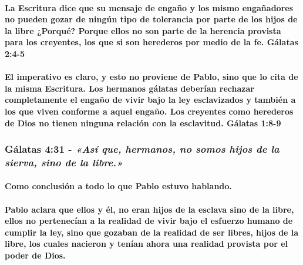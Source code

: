 \documentclass[11a pt,twoside]{article}
\newcommand{\scripture}[1]{%
  {\fontsize{12pt}{16pt}\selectfont\ScriptureFont\itshape #1}%
}
\let\oldsubsubsection\subsubsection
\renewcommand{\subsubsection}{\needspace{4\baselineskip}\oldsubsubsection}
\let\oldparagraph\paragraph
\renewcommand{\paragraph}{\needspace{3\baselineskip}\oldparagraph}
\begin{document}
\paragraph{La Escritura dice que su mensaje de engaño y los mismo
engañadores no pueden gozar de ningún tipo de tolerancia por parte de
los hijos de la libre ¿Porqué? Porque ellos no son parte de la herencia
provista para los creyentes, los que si son herederos por medio de la
fe. Gálatas
2:4-5}\label{la-escritura-dice-que-su-mensaje-de-engauxf1o-y-los-mismo-engauxf1adores-no-pueden-gozar-de-ninguxfan-tipo-de-tolerancia-por-parte-de-los-hijos-de-la-libre-porquuxe9-porque-ellos-no-son-parte-de-la-herencia-provista-para-los-creyentes-los-que-si-son-herederos-por-medio-de-la-fe.-guxe1latas-24-5}

\paragraph{El imperativo es claro, y esto no proviene de Pablo, sino que
lo cita de la misma Escritura. Los hermanos gálatas deberían rechazar
completamente el engaño de vivir bajo la ley esclavizados y también a
los que viven conforme a aquel engaño. Los creyentes como herederos de
Dios no tienen ninguna relación con la esclavitud. Gálatas
1:8-9}\label{el-imperativo-es-claro-y-esto-no-proviene-de-pablo-sino-que-lo-cita-de-la-misma-escritura.-los-hermanos-guxe1latas-deberuxedan-rechazar-completamente-el-engauxf1o-de-vivir-bajo-la-ley-esclavizados-y-tambiuxe9n-a-los-que-viven-conforme-a-aquel-engauxf1o.-los-creyentes-como-herederos-de-dios-no-tienen-ninguna-relaciuxf3n-con-la-esclavitud.-guxe1latas-18-9}

\subsubsection{\texorpdfstring{Gálatas 4:31 -
\scripture{«Así que, hermanos, no somos hijos de la sierva, sino de la libre.»}}{Gálatas 4:31 - }}\label{guxe1latas-431---asuxed-que-hermanos-no-somos-hijos-de-la-sierva-sino-de-la-libre.}

\paragraph{Como conclusión a todo lo que Pablo estuvo
hablando.}\label{como-conclusiuxf3n-a-todo-lo-que-pablo-estuvo-hablando.}

\paragraph{Pablo aclara que ellos y él, no eran hijos de la esclava sino
de la libre, ellos no pertenecían a la realidad de vivir bajo el
esfuerzo humano de cumplir la ley, sino que gozaban de la realidad de
ser libres, hijos de la libre, los cuales nacieron y tenían ahora una
realidad provista por el poder de
Dios.}\label{pablo-aclara-que-ellos-y-uxe9l-no-eran-hijos-de-la-esclava-sino-de-la-libre-ellos-no-pertenecuxedan-a-la-realidad-de-vivir-bajo-el-esfuerzo-humano-de-cumplir-la-ley-sino-que-gozaban-de-la-realidad-de-ser-libres-hijos-de-la-libre-los-cuales-nacieron-y-tenuxedan-ahora-una-realidad-provista-por-el-poder-de-dios.}
\end{document}
